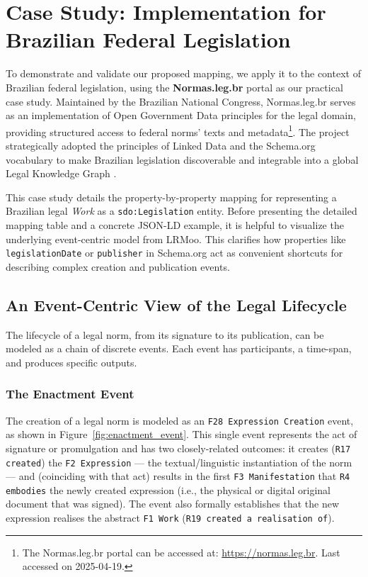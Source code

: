 \documentclass[11pt]{article}
\begin{document}
\section{Case Study: Implementation for Brazilian Federal Legislation}
To demonstrate and validate our proposed mapping, we apply it to the context of Brazilian federal legislation, using the \textbf{Normas.leg.br} portal as our practical case study. Maintained by the Brazilian National Congress, Normas.leg.br serves as an implementation of Open Government Data principles for the legal domain, providing structured access to federal norms' texts and metadata\footnote{The Normas.leg.br portal can be accessed at: \url{https://normas.leg.br}. Last accessed on 2025-04-19.}. The project strategically adopted the principles of Linked Data and the Schema.org vocabulary to make Brazilian legislation discoverable and integrable into a global Legal Knowledge Graph \cite{demartim2019proposal, bizer2008ldow}.

This case study details the property-by-property mapping for representing a Brazilian legal \textit{Work} as a \texttt{sdo:Legislation} entity. Before presenting the detailed mapping table and a concrete JSON-LD example, it is helpful to visualize the underlying event-centric model from LRMoo. This clarifies how properties like \texttt{legislationDate} or \texttt{publisher} in Schema.org act as convenient shortcuts for describing complex creation and publication events.

\subsection{An Event-Centric View of the Legal Lifecycle}

The lifecycle of a legal norm, from its signature to its publication, can be modeled as a chain of discrete events. Each event has participants, a time-span, and produces specific outputs.

\subsubsection{The Enactment Event}
The creation of a legal norm is modeled as an \texttt{F28 Expression Creation} event, as shown in Figure~\ref{fig:enactment_event}. This single event represents the act of signature or promulgation and has two closely-related outcomes: it creates (\texttt{R17 created}) the \texttt{F2 Expression} — the textual/linguistic instantiation of the norm — and (coinciding with that act) results in the first \texttt{F3 Manifestation} that \texttt{R4 embodies} the newly created expression (i.e., the physical or digital original document that was signed). The event also formally establishes that the new expression realises the abstract \texttt{F1 Work} (\texttt{R19 created a realisation of}). 
\end{document}
